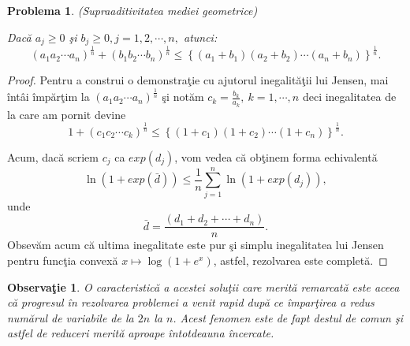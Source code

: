 \documentclass[a4paper,12pt,oneside]{report}
\newtheorem{problem}{Problema}
\newtheorem{remark}{Observa\c{t}ie}
\begin{document}
\begin{problem} (Supraaditivitatea mediei geometrice)
  
Dac\u{a} \(a_{j}\geq 0 \) \c{s}i \(b_{j}\geq 0, j = 1 , 2, \cdots, n,\) atunci:
\begin{displaymath}
  \left ( a_{1}a_{2}\cdots a_{n} \right )^{\frac{1}{n}} + \left ( b_{1}b_{2}\cdots b_{n} \right )^{\frac{1}{n}} \leq  \left \{ \left ( a_{1} + b_{1}\right ) \left ( a_{2} + b_{2} \right )\cdots \left ( a_{n} + b_{n} \right )\right \}^{\frac{1}{n}}.
\end{displaymath}
\end{problem}
  \begin{proof}
  Pentru a construi o demonstra\c{t}ie cu ajutorul inegalit\u{a}\c{t}ii lui Jensen, mai \^{i}nt\^{a}i \^{i}mp\u{a}r\c{t}im la
\(\left ( a_{1}a_{2}\cdots a_{n} \right )^{\frac{1}{n}}\) \c{s}i not\u{a}m \(c_{k}=\frac{b_{k}}{a_{k}},~k=1,\cdots, n\) deci inegalitatea de la care am pornit devine
\begin{displaymath}
  1 + \left ( c_{1}c_{2} \cdots c_{k}\right )^{\frac{1}{n}}\leq \left \{ \left ( 1 + c_{1} \right )\left ( 1 + c_{2} \right )\cdots \left ( 1 + c_{n} \right ) \right \}^{\frac{1}{n}}.
\end{displaymath}

Acum, dac\u{a} scriem \(c_{j}\) ca \(exp\left (d _{j} \right )\), vom vedea c\u{a} ob\c{t}inem forma echivalent\u{a}
\begin{displaymath}
  \ln\left ( 1 + exp\left ( \bar{d} \right ) \right ) \leq \frac{1}{n}\sum_{j = 1}^{n}\ln\left ( 1 + exp\left ( d_{j} \right ) \right ),
\end{displaymath}
unde
\begin{displaymath}
  \bar{d} = \frac{\left ( d_{1} + d_{2}  + \cdots + d_{n}\right )}{n}.
\end{displaymath}
Obsev\u{a}m acum c\u{a} ultima inegalitate este pur \c{s}i simplu inegalitatea lui Jensen pentru func\c{t}ia convex\u{a} \(x \mapsto \log \left ( 1 + e^{x} \right )\), astfel, rezolvarea este complet\u{a}.
\end{proof}
\begin{remark}
O caracteristic\u{a} a acestei solu\c{t}ii care merit\u{a} remarcat\u{a} este aceea c\u{a} progresul \^{i}n rezolvarea problemei a venit rapid dup\u{a} ce \^{i}mpar\c{t}irea a redus num\u{a}rul de variabile de la \(2n\) la \(n\). Acest fenomen este de fapt destul de comun \c{s}i astfel de reduceri merit\u{a} aproape \^{i}ntotdeauna \^{i}ncercate.
\end{remark}
\end{document}
